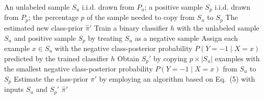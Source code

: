 \documentclass{article}
\begin{document}
\begin{algorithm}[!h]
\renewcommand{\algorithmicrequire}{\textbf{Input:}} %
\renewcommand{\algorithmicensure}{\textbf{Output:}} %
	\caption{ReCPE (regrouping class-prior estimation)} %
	\begin{algorithmic}[1] %
	    \REQUIRE
	    An unlabeled sample $S_{u}$ i.i.d. drawn from $P_{u}$; a positive sample $S_{p}$
	    i.i.d. drawn from $P_{p}$; the percentage $p$ of the sample needed to copy from
	    $S_{u}$ to $S_{p}$
	    \ENSURE
	    The estimated new class-prior $\hat{\pi}'$
	    \STATE Train a binary classifier $h$ with the unlabeled sample $S_{u}$ and positive
	    sample $S_{p}$ by treating $S_{u}$ as a negative sample %
	    \STATE Assign each example $x\in S_{u}$ with the negative class-posterior probability
	    $P(Y=-1\mid X=x)$ predicted by the trained classifier $h$
	    \STATE Obtain $S_{p}'$ by copying $p\times|S_{u}|$ examples with the smallest negative
	    class-posterior probability $P(Y=-1\mid X=x)$ from $S_{u}$ to $S_{p}$ %
	    \STATE Estimate the class-prior $\pi'$ by employing an algorithm based on Eq.~(5)
	    with inputs $S_{u}$ and $S_{p}'$ %
		\RETURN $\hat{\pi}'$
	\end{algorithmic}
\end{algorithm}
\end{document}
